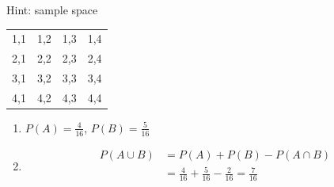 \documentclass[slidestop,compress,mathserif]{beamer}
\begin{document}

\begin{frame}%


 

{
Hint: sample space
\begin{center}
\begin{tabular}{cccc}
1,1 & 1,2 & 1,3 & 1,4 \\
2,1 & 2,2 & 2,3 & 2,4 \\
3,1 & 3,2 & 3,3 & 3,4 \\
4,1 & 4,2 & 4,3 & 4,4 \\
\end{tabular}
\end{center}
}
{
 
\begin{enumerate}
\item
$P(A)  = \frac{4}{16}$, $P(B)  = \frac{5}{16}$
 
\item
\begin{align*}
P(A \cup B) & = P(A) + P(B) - P(A \cap B)\\
		  & = \frac{4}{16} + \frac{5}{16} - \frac{2}{16} = \frac{7}{16}\\
\end{align*}
\end{enumerate}
}
\end{frame}


%
%
% 
% 
% 
%
%
\end{document}
